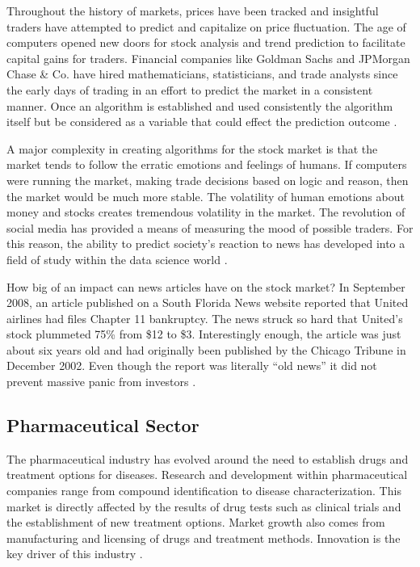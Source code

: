 \documentclass[sigconf]{acmart}
\begin{document}
Throughout the history of markets, prices have been tracked and insightful traders have attempted to predict and capitalize on price fluctuation. The age of computers opened new doors for stock analysis and trend prediction to facilitate capital gains for traders. Financial companies like Goldman Sachs and JPMorgan Chase \& Co. have hired mathematicians, statisticians, and trade analysts since the early days of trading in an effort to predict the market in a consistent manner. Once an algorithm is established and used consistently the algorithm itself but be considered as a variable that could effect the prediction outcome \cite{Hellstrom}. 

A major complexity in creating algorithms for the stock market is that the market tends to follow the erratic emotions and feelings of humans. If computers were running the market, making trade decisions based on logic and reason, then the market would be much more stable. The volatility of human emotions about money and stocks creates tremendous volatility in the market. The revolution of social media has provided a means of measuring the mood of possible traders. For this reason, the ability to predict society's reaction to news has developed into a field of study within the data science world \cite{BOLLEN}. 

How big of an impact can news articles have on the stock market? In September 2008, an article published on a South Florida News website reported that United airlines had files Chapter 11 bankruptcy. The news struck so hard that United's stock plummeted 75\% from \$12 to \$3. Interestingly enough, the article was just about six years old and had originally been published by the Chicago Tribune in December 2002. Even though the report was literally ``old news'' it did not prevent massive panic from investors \cite{www-chTrib}.



\subsection{Pharmaceutical Sector}
The pharmaceutical industry has evolved around the need to establish drugs and treatment options for diseases. Research and development within pharmaceutical companies range from compound identification to disease characterization. This market is directly affected by the results of drug tests such as clinical trials and the establishment of new treatment options. Market growth also comes from manufacturing and licensing of drugs and treatment methods. Innovation is the key driver of this industry \cite{Gassmann}.
\end{document}
